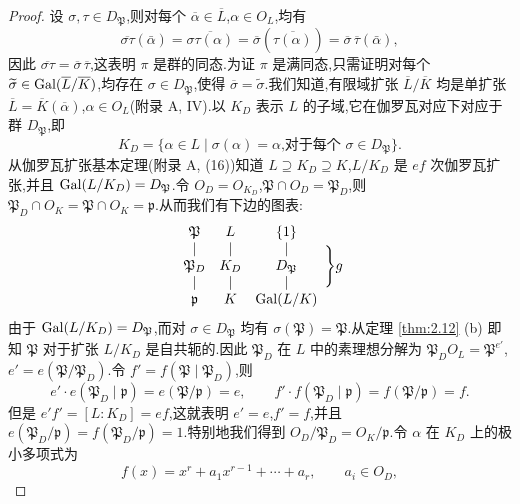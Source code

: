\begin{proof}
设 $\sigma,\tau\in D_{\mathfrak{P}}$,则对每个 $\overline{\alpha}\in\overline{L}$,$\alpha\in O_L$,均有
\[
  \overline{\sigma\tau}(\bar{\alpha})=\overline{\sigma\tau(\alpha)}
  =\overline{\sigma}(\overline{\tau(\alpha)})=\overline{\sigma}\,\overline{\tau}(\bar{\alpha}),
\]
因此 $\overline{\sigma\tau}=\overline{\sigma}\,\overline{\tau}$,这表明 $\pi$ 是群的同态.为证 $\pi$ 是满同态,只需证明对每个 $\widetilde{\sigma}\in\operatorname{Gal}(\overline{L}/\overline{K})$,均存在 $\sigma\in D_{\mathfrak{P}}$,使得 $\overline{\sigma}=\widetilde{\sigma}$.我们知道,有限域扩张 $\overline{L}/\overline{K}$ 均是单扩张 $\overline{L}=\overline{K}(\overline{\alpha})$,$\alpha\in O_L$(附录 A, IV).以 $K_D$ 表示 $L$ 的子域,它在伽罗瓦对应下对应于群 $D_{\mathfrak{P}}$,即
\[
  K_D=\{\alpha\in L\mid\sigma(\alpha)=\alpha\text{,对于每个 }\sigma\in D_{\mathfrak{P}}\}.
\]
从伽罗瓦扩张基本定理(附录 A, (16))知道 $L\supseteq K_D\supseteq K$,$L/K_D$ 是 $ef$ 次伽罗瓦扩张,并且 $\operatorname{Gal}(L/K_D)=D_{\mathfrak{P}}$.令 $O_D=O_{K_D}$,$\mathfrak{P}\cap O_D=\mathfrak{P}_D$,则 $\mathfrak{P}_D\cap O_K=\mathfrak{P}\cap O_K=\mathfrak{p}$.从而我们有下边的图表:
\[
  \begin{array}{ccc}
    \mathfrak{P} & L & \{1\}\\
    \mid & \mid & \mid\\
    \mathfrak{P}_D & K_D & D_{\mathfrak{P}}\\
    \mid & \mid & \mid\\
    \mathfrak{p} & K & \operatorname{Gal}(L/K)
  \end{array}\Bigg\} g
\]
由于 $\operatorname{Gal}(L/K_D)=D_{\mathfrak{P}}$,而对 $\sigma\in D_{\mathfrak{P}}$ 均有 $\sigma(\mathfrak{P})=\mathfrak{P}$.从定理 \ref{thm:2.12} (b) 即知 $\mathfrak{P}$ 对于扩张 $L/K_D$ 是自共轭的.因此 $\mathfrak{P}_D$ 在 $L$ 中的素理想分解为 $\mathfrak{P}_DO_L=\mathfrak{P}^{e'}$,$e'=e(\mathfrak{P}/\mathfrak{P}_D)$.令 $f'=f(\mathfrak{P}\mid\mathfrak{P}_D)$,则
\[
  e'\cdot e(\mathfrak{P}_D\mid\mathfrak{p})=e(\mathfrak{P}/\mathfrak{p})=e,\qquad
  f'\cdot f(\mathfrak{P}_D\mid\mathfrak{p})=f(\mathfrak{P}/\mathfrak{p})=f.
\]
但是 $e'f'=[L:K_D]=ef$,这就表明 $e'=e$,$f'=f$,并且 $e(\mathfrak{P}_D/\mathfrak{p})=f(\mathfrak{P}_D/\mathfrak{p})=1$.特别地我们得到 $O_D/\mathfrak{P}_D=O_K/\mathfrak{p}$.令 $\alpha$ 在 $K_D$ 上的极小多项式为
\[
  f(x)=x^r+a_1x^{r-1}+\cdots+a_r,\qquad a_i\in O_D,
\]

\end{proof}
